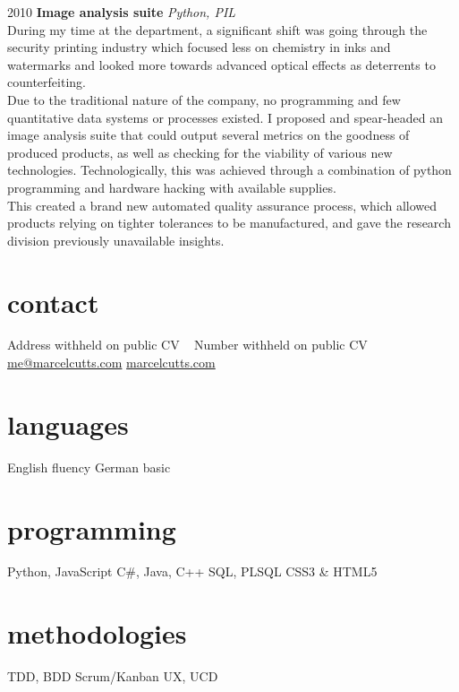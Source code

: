 \documentclass[]{friggeri-cv} %
\begin{document}
\begin{entrylist}
\entry
{2010}
{\textbf{Image analysis suite}}
{}
{\emph{Python, PIL} \\
During my time at the department, a significant shift was going through the security printing industry which focused less on chemistry in inks and watermarks and looked more towards advanced optical effects as deterrents  to counterfeiting. \\
Due to the traditional nature of the company, no programming and few quantitative data systems or processes existed. I proposed and spear-headed an image analysis suite that could output several metrics on the goodness of produced products, as well as checking for the viability of various new technologies. Technologically, this was achieved through a combination of python programming and hardware hacking with available supplies. \\
This created a brand new automated quality assurance process, which allowed products relying on tighter tolerances to be manufactured, and gave the research division previously unavailable insights.
}

\end{entrylist}

\begin{asidenoheader} %
\section{contact}
Address withheld on public CV
~
Number withheld on public CV
~
\href{mailto:me@marcelcutts.com}{me@marcelcutts.com}
\href{http://www.marcelcutts.com}{marcelcutts.com}
\section{languages}
English fluency
German basic
\section{programming}
Python, JavaScript
C\#, Java, C++
SQL, PLSQL
CSS3 \& HTML5
\section{methodologies}
TDD, BDD
Scrum/Kanban
UX, UCD
\end{asidenoheader}








\end{document}
